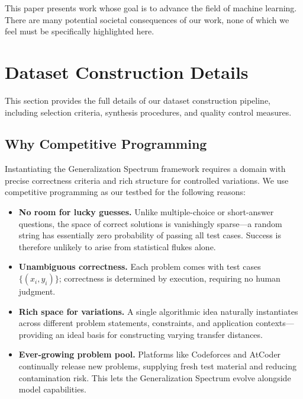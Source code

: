 \documentclass[]{bytedance_seed}
\theoremstyle{plain}
\theoremstyle{definition}
\theoremstyle{remark}
\begin{document}
This paper presents work whose goal is to advance the field of machine learning. There are many potential societal consequences of our work, none of which we feel must be specifically highlighted here.



\clearpage




\clearpage

\beginappendix

\appendix

\section{Dataset Construction Details}
\label{app:dataset-construction}

This section provides the full details of our dataset construction pipeline, including selection criteria, synthesis procedures, and quality control measures.

\subsection{Why Competitive Programming}
\label{app:why-cp}

Instantiating the Generalization Spectrum framework requires a domain with precise correctness criteria and rich structure for controlled variations. We use competitive programming as our testbed for the following reasons:

\begin{itemize}
    \item \textbf{No room for lucky guesses.} Unlike multiple-choice or short-answer questions, the space of correct solutions is vanishingly sparse---a random string has essentially zero probability of passing all test cases. Success is therefore unlikely to arise from statistical flukes alone.

    \item \textbf{Unambiguous correctness.} Each problem comes with test cases $\{(x_i, y_i)\}$; correctness is determined by execution, requiring no human judgment.

    \item \textbf{Rich space for variations.} A single algorithmic idea naturally instantiates across different problem statements, constraints, and application contexts---providing an ideal basis for constructing varying transfer distances.

    \item \textbf{Ever-growing problem pool.} Platforms like Codeforces and AtCoder continually release new problems, supplying fresh test material and reducing contamination risk. This lets the Generalization Spectrum evolve alongside model capabilities.
\end{itemize}
\end{document}
